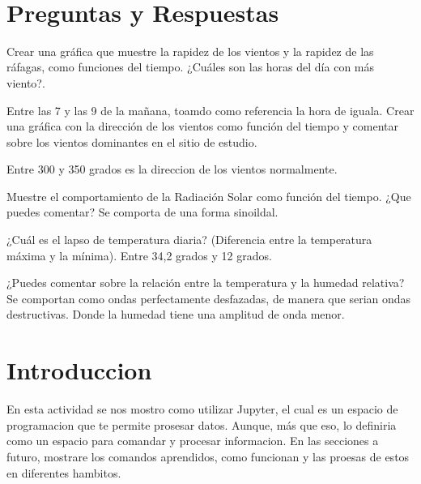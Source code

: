 \documentclass[11pt]{article}
\begin{document}
    \begin{center}
    \end{center}
    { \hspace*{\fill} \\}
    

     \section{Preguntas y Respuestas}
     
     Crear una gráfica que muestre la rapidez de los vientos y la rapidez de las ráfagas, como funciones del tiempo. ¿Cuáles son las horas del día con más viento?.
     \linebreak
     
     Entre las 7 y las 9 de la mañana, toamdo como referencia la hora de iguala.
     \linebreak
Crear una gráfica con la dirección de los vientos como función del tiempo y comentar sobre los vientos dominantes en el sitio de estudio.
\linebreak

Entre 300 y 350 grados es la direccion de los vientos normalmente.
\linebreak

Muestre el comportamiento de la Radiación Solar como función del tiempo. ¿Que puedes comentar? 
\linebreak
Se comporta de una forma sinoildal.
\linebreak

¿Cuál es el lapso de temperatura diaria? (Diferencia entre la temperatura máxima y la mínima).
\linebreak
Entre 34,2 grados y 12 grados.
\linebreak

¿Puedes comentar sobre la relación entre la temperatura y la humedad relativa?
\linebreak
Se comportan como ondas perfectamente desfazadas, de manera que serian ondas destructivas. Donde la humedad tiene una amplitud de onda menor.
\linebreak
    
    \section{Introduccion}

En esta actividad se nos mostro como utilizar Jupyter, el cual es un espacio de programacion que te permite prosesar datos. Aunque, más que eso, lo definiria como un espacio para comandar y procesar informacion. En las secciones a futuro, mostrare los comandos aprendidos, como funcionan y las proesas de estos en diferentes hambitos.
\end{document}
